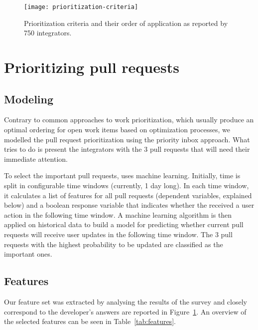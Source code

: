 \documentclass[conference]{IEEEtran}
\begin{document}
\begin{figure}[t]
  \begin{center}
    \texttt{[image: prioritization-criteria]}
  \end{center}
  \caption{Prioritization criteria and their order of application as reported by
  750 integrators.}
  \label{fig:prioritization}
\end{figure}


\section{Prioritizing pull requests}

\subsection{Modeling} Contrary to common approaches to work prioritization, which usually produce
an optimal ordering for open work items based on optimization processes, we
modelled the pull request prioritization using the priority inbox approach.
What \prioritizer tries to do is present the integrators with the 3 pull
requests that will need their immediate attention. 

To select the important pull requests, \prioritizer uses machine learning.
Initially, time is split in configurable time windows (currently, 1 day long).
In each time window, it calculates a list of features for all pull requests
(dependent variables, explained below) and a boolean response variable that
indicates whether the received a user action in the following time window. A
machine learning algorithm is then applied on historical data to build a model
for predicting whether current pull requests will receive user updates in the
following time window. The 3 pull requests with the highest probability to be
updated are classified as the important ones. 

\subsection{Features}
\label{sec:features}
Our feature set was extracted by analysing the results of the survey and
closely correspond to the developer's answers are reported in
Figure~\ref{fig:prioritization}. An overview of the selected features can
be seen in Table~\ref{tab:features}.
\end{document}
